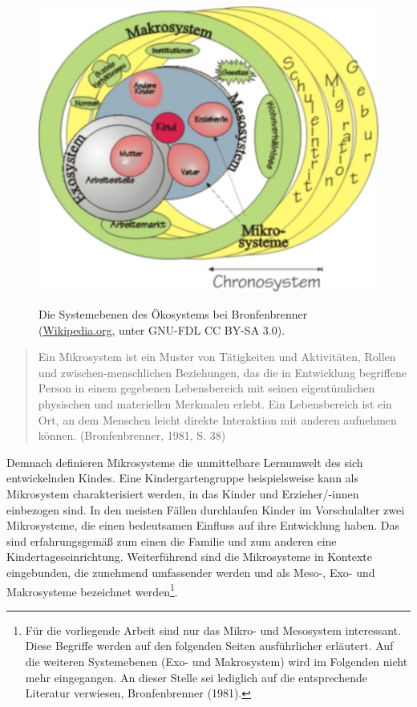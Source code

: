 \documentclass[12pt,a4paper]{article}
\begin{document}
\begin{figure}[h]
\centering
\includegraphics[scale=0.6]{figures/OekosystemBronfenbrenner}
\label{fig_bronf}
\caption{Die Systemebenen des Ökosystems bei Bronfenbrenner (\href{https://de.wikipedia.org/wiki/Datei:\%C3\%96kosystemBronfenbrenner.jpg}{Wikipedia.org}, unter GNU-FDL CC BY-SA 3.0).}
\end{figure}

 \begin{quote}
Ein Mikrosystem ist ein Muster von Tätigkeiten und Aktivitäten, Rollen und zwischen-menschlichen Beziehungen, das die in Entwicklung begriffene Person in einem gegebenen Lebensbereich mit seinen eigentümlichen physischen und materiellen Merkmalen erlebt. Ein Lebensbereich ist ein Ort, an dem Menschen leicht direkte Interaktion mit anderen aufnehmen können.  (Bronfenbrenner, 1981, S. 38)
 \end{quote}
Demnach definieren Mikrosysteme die unmittelbare Lernumwelt des sich entwickelnden Kindes. Eine Kindergartengruppe beispielsweise kann als Mikrosystem charakterisiert werden, in das Kinder und Erzieher/-innen einbezogen sind. In den meisten Fällen durchlaufen Kinder im Vorschulalter zwei Mikrosysteme, die einen bedeutsamen Einfluss auf ihre Entwicklung haben. Das sind erfahrungsgemäß zum einen die Familie und zum anderen eine Kindertageseinrichtung. Weiterführend sind die Mikrosysteme in Kontexte eingebunden, die zunehmend umfassender werden und als Meso-, Exo- und Makrosysteme bezeichnet werden\footnote{Für die vorliegende Arbeit sind nur das Mikro- und Mesosystem interessant. Diese Begriffe werden auf den folgenden Seiten ausführlicher erläutert. Auf die weiteren Systemebenen (Exo- und Makrosystem) wird im Folgenden nicht mehr eingegangen. An dieser Stelle sei lediglich auf die entsprechende Literatur verwiesen, Bronfenbrenner (1981).}. 
\end{document}

